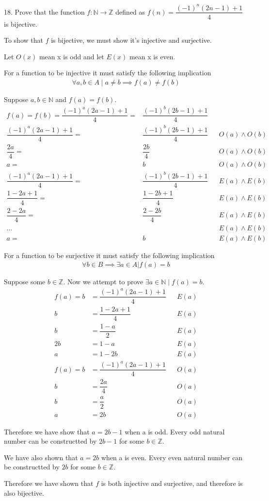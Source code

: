 \documentclass{idrisMemo}
\newcommand{\inj}{
\item For a function to be injective it must satisfy the following implication
\begin{align*}
    \forall a,b \in A\mid a\neq b\implies f(a)\neq f(b)
\end{align*}
}
\newcommand{\surj}{
\item For a function to be surjective it must satisfy the following implication
\begin{align*}
    \forall b \in B \implies \exists a \in A | f(a) = b
\end{align*}
}
\begin{document}
\begin{prooflist}{18. Prove that the function $f: \mathbb{N} \rightarrow
    \mathbb{Z}$ defined as \mbox{$f(n)=\dfrac{(-1)^n(2 n-1)+1}{4}$} is bijective.}
\item To show that $f$ is bijective, we must show it's injective and surjective.
\item Let $O(x)$ mean x is odd and let $E(x)$ mean x is even.
\inj{}
\item Suppose $a, b \in \mathbb{N}$ and $f(a)=f(b)$.
\begin{align*}
    f(a)=f(b)=\dfrac{(-1)^a(2 a-1)+1}{4} =& \dfrac{(-1)^b(2 b-1)+1}{4}\\
    \dfrac{(-1)^a(2 a-1)+1}{4} =& \dfrac{(-1)^b(2 b-1)+1}{4}&&O(a)\land O(b)\\
    \dfrac{2 a}{4} =& \dfrac{2b}{4}&&O(a)\land O(b)\\
    a =& b&&O(a)\land O(b)\\
    \dfrac{(-1)^a(2 a-1)+1}{4} =& \dfrac{(-1)^b(2 b-1)+1}{4}&&E(a)\land E(b)\\
    \dfrac{1 - 2a + 1}{4} =& \dfrac{1-2b+1}{4}&&E(a)\land E(b)\\
    \dfrac{2 - 2a}{4} =& \dfrac{2-2b}{4}&&E(a)\land E(b)\\
    \dots &&&E(a)\land E(b)\\
    a =& b&&E(a)\land E(b)
\end{align*}
\surj{}
\item Suppose some $b \in \mathbb{Z}$. Now we attempt to prove $\exists
    a\in\mathbb{N}\mid f(a)=b$.
\begin{align*}
    f(a)=b&=\dfrac{(-1)^a(2 a-1)+1}{4} &&E(a)\\
    b&=\dfrac{1-2a+1}{4} &&E(a)\\
    b&=\dfrac{1-a}{2} &&E(a)\\
    2b&=1-a &&E(a)\\
    a&=1-2b &&E(a)\\
    f(a)=b&=\dfrac{(-1)^a(2 a-1)+1}{4} &&O(a)\\
    b&=\dfrac{2a}{4} &&O(a)\\
    b&=\dfrac{a}{2} &&O(a)\\
    a&=2b &&O(a)
\end{align*}
\item Therefore we have show that $a=2b-1$ when a is odd. Every odd natural number can
be constructted by $2b-1$ for some $b\in\mathbb{Z}$.
\item We have also shown that $a=2b$ when a is even. Every even natural number can
be constructted by $2b$ for some $b\in\mathbb{Z}$.
\item Therefore we have shown that $f$ is both injective and surjective, and
    therefore is also bijective.
\end{prooflist}
\end{document}
